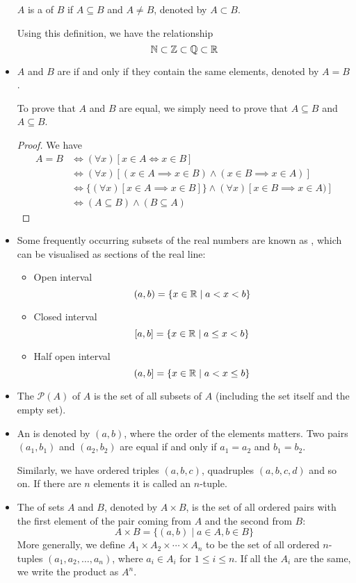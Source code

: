 \begin{itemize}
$A$ is a  of $B$ if $A \subseteq B$ and $A \neq B$, denoted by $A \subset B$.

Using this definition, we have the relationship 
\[ \mathbb N \subset \mathbb Z \subset \mathbb Q \subset \mathbb R \]

\item $A$ and $B$ are  if and only if they contain the same elements, denoted by $A=B$.

To prove that $A$ and $B$ are equal, we simply need to prove that $A \subseteq B$ and $A \subseteq B$.

\begin{proof}
We have 
\begin{align*}
A = B &\iff (\forall x)[x \in A \iff x \in B] \\
&\iff (\forall x)[(x \in A \implies x \in B) \land (x \in B \implies x \in A)] \\
&\iff \{(\forall x)[x \in A \implies x \in B]\} \land {(\forall x)[x \in B \implies x \in A)]} \\
&\iff (A \subseteq B) \land (B \subseteq A)
\end{align*}
\end{proof}

\item Some frequently occurring subsets of the real numbers are known as , which can be visualised as sections of the real line:
\begin{itemize}
\item Open interval
\[ (a,b) = \{x\in\mathbb R \mid a<x<b\} \]
\item Closed interval
\[ [a,b] = \{x\in\mathbb R \mid a\le x<b\} \]
\item Half open interval
\[ (a,b] = \{x\in\mathbb R \mid a<x\le b\} \]
\end{itemize}

\item The  $\mathcal{P}(A)$ of $A$ is the set of all subsets of $A$ (including the set itself and the empty set).

\item An  is denoted by $(a,b)$, where the order of the elements matters. Two pairs $(a_1,b_1)$ and $(a_2,b_2)$ are equal if and only if $a_1=a_2$ and $b_1=b_2$. 

Similarly, we have ordered triples $(a,b,c)$, quadruples $(a,b,c,d)$ and so on. If there are $n$ elements it is called an $n$-tuple.

\item The  of sets $A$ and $B$, denoted by $A \times B$, is the set of all ordered pairs with the first element of the pair coming from $A$ and the
second from $B$:
\begin{equation}
A \times B = \{(a,b) \mid a \in A, b \in B\}
\end{equation}
More generally, we define $A_1 \times A_2 \times \cdots \times A_n$ to be the set of all ordered $n$-tuples $(a_1, a_2, \dots, a_n)$, where $a_i \in A_i$ for $1 \le i \le n$. If all the $A_i$ are the same, we write the product as $A^n$.


\end{itemize}
